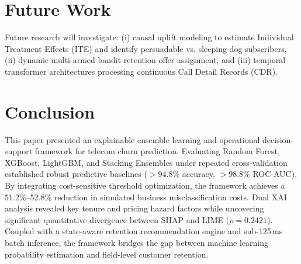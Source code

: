 \documentclass[conference]{IEEEtran}
\begin{document}
\section{Future Work}
Future research will investigate: (i) causal uplift modeling to estimate Individual Treatment Effects (ITE) and identify persuadable vs. sleeping-dog subscribers, (ii) dynamic multi-armed bandit retention offer assignment, and (iii) temporal transformer architectures processing continuous Call Detail Records (CDR).

\section{Conclusion}
This paper presented an explainable ensemble learning and operational decision-support framework for telecom churn prediction. Evaluating Random Forest, XGBoost, LightGBM, and Stacking Ensembles under repeated cross-validation established robust predictive baselines ($>94.8\%$ accuracy, $>98.8\%$ ROC-AUC). By integrating cost-sensitive threshold optimization, the framework achieves a 51.2\%--52.8\% reduction in simulated business misclassification costs. Dual XAI analysis revealed key tenure and pricing hazard factors while uncovering significant quantitative divergence between SHAP and LIME ($\rho = 0.2421$). Coupled with a state-aware retention recommendation engine and sub-125\,ms batch inference, the framework bridges the gap between machine learning probability estimation and field-level customer retention.



\end{document}
